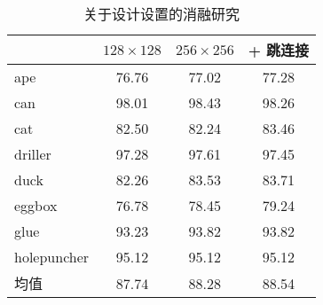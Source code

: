\begin{table}
    \centering
     \caption{关于设计设置的消融研究}
    \begin{tabular}{lccc}
    \toprule 
    & $128\times128$ & $256\times256$ & + 跳连接 \\
    \midrule
    ape & 76.76 & 77.02 & 77.28 \\
    can & 98.01 & 98.43 & 98.26 \\
    cat & 82.50 & 82.24 & 83.46 \\
    driller & 97.28 & 97.61 & 97.45 \\
    duck & 82.26 & 83.53 & 83.71 \\
    eggbox & 76.78 & 78.45 & 79.24 \\
    glue & 93.23 & 93.82 & 93.82 \\
    holepuncher & 95.12 & 95.12 & 95.12 \\
    \midrule
    均值 & 87.74 & 88.28 & 88.54 \\
    \bottomrule
  \end{tabular}
  \label{tab:main_ablation}
\end{table}